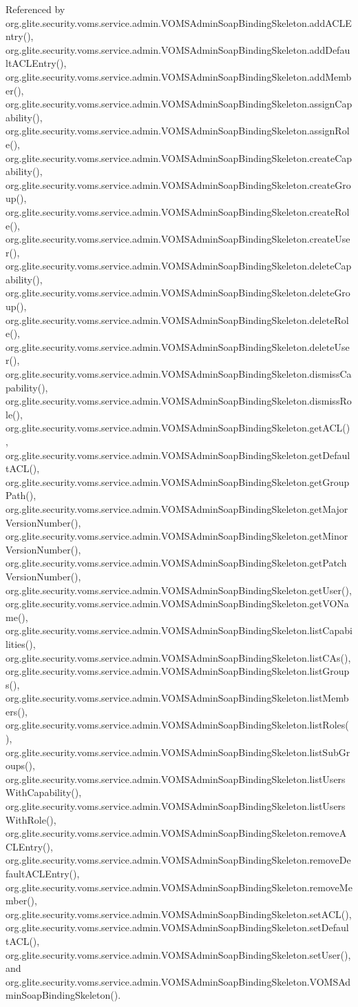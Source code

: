 Referenced by org.glite.security.voms.service.admin.VOMSAdminSoapBindingSkeleton.addACLEntry(), org.glite.security.voms.service.admin.VOMSAdminSoapBindingSkeleton.addDefaultACLEntry(), org.glite.security.voms.service.admin.VOMSAdminSoapBindingSkeleton.addMember(), org.glite.security.voms.service.admin.VOMSAdminSoapBindingSkeleton.assignCapability(), org.glite.security.voms.service.admin.VOMSAdminSoapBindingSkeleton.assignRole(), org.glite.security.voms.service.admin.VOMSAdminSoapBindingSkeleton.createCapability(), org.glite.security.voms.service.admin.VOMSAdminSoapBindingSkeleton.createGroup(), org.glite.security.voms.service.admin.VOMSAdminSoapBindingSkeleton.createRole(), org.glite.security.voms.service.admin.VOMSAdminSoapBindingSkeleton.createUser(), org.glite.security.voms.service.admin.VOMSAdminSoapBindingSkeleton.deleteCapability(), org.glite.security.voms.service.admin.VOMSAdminSoapBindingSkeleton.deleteGroup(), org.glite.security.voms.service.admin.VOMSAdminSoapBindingSkeleton.deleteRole(), org.glite.security.voms.service.admin.VOMSAdminSoapBindingSkeleton.deleteUser(), org.glite.security.voms.service.admin.VOMSAdminSoapBindingSkeleton.dismissCapability(), org.glite.security.voms.service.admin.VOMSAdminSoapBindingSkeleton.dismissRole(), org.glite.security.voms.service.admin.VOMSAdminSoapBindingSkeleton.getACL(), org.glite.security.voms.service.admin.VOMSAdminSoapBindingSkeleton.getDefaultACL(), org.glite.security.voms.service.admin.VOMSAdminSoapBindingSkeleton.getGroupPath(), org.glite.security.voms.service.admin.VOMSAdminSoapBindingSkeleton.getMajorVersionNumber(), org.glite.security.voms.service.admin.VOMSAdminSoapBindingSkeleton.getMinorVersionNumber(), org.glite.security.voms.service.admin.VOMSAdminSoapBindingSkeleton.getPatchVersionNumber(), org.glite.security.voms.service.admin.VOMSAdminSoapBindingSkeleton.getUser(), org.glite.security.voms.service.admin.VOMSAdminSoapBindingSkeleton.getVOName(), org.glite.security.voms.service.admin.VOMSAdminSoapBindingSkeleton.listCapabilities(), org.glite.security.voms.service.admin.VOMSAdminSoapBindingSkeleton.listCAs(), org.glite.security.voms.service.admin.VOMSAdminSoapBindingSkeleton.listGroups(), org.glite.security.voms.service.admin.VOMSAdminSoapBindingSkeleton.listMembers(), org.glite.security.voms.service.admin.VOMSAdminSoapBindingSkeleton.listRoles(), org.glite.security.voms.service.admin.VOMSAdminSoapBindingSkeleton.listSubGroups(), org.glite.security.voms.service.admin.VOMSAdminSoapBindingSkeleton.listUsersWithCapability(), org.glite.security.voms.service.admin.VOMSAdminSoapBindingSkeleton.listUsersWithRole(), org.glite.security.voms.service.admin.VOMSAdminSoapBindingSkeleton.removeACLEntry(), org.glite.security.voms.service.admin.VOMSAdminSoapBindingSkeleton.removeDefaultACLEntry(), org.glite.security.voms.service.admin.VOMSAdminSoapBindingSkeleton.removeMember(), org.glite.security.voms.service.admin.VOMSAdminSoapBindingSkeleton.setACL(), org.glite.security.voms.service.admin.VOMSAdminSoapBindingSkeleton.setDefaultACL(), org.glite.security.voms.service.admin.VOMSAdminSoapBindingSkeleton.setUser(), and org.glite.security.voms.service.admin.VOMSAdminSoapBindingSkeleton.VOMSAdminSoapBindingSkeleton().



